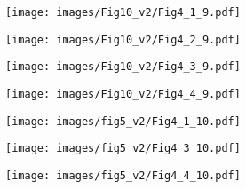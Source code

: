 \begin{figure*}
    \begin{subfigure}{0.24\textwidth}
        \centering
        \texttt{[image: images/Fig10\_v2/Fig4\_1\_9.pdf]}
\label{fig:qualisup:rgb}
        \end{subfigure}
    \hfill
        \begin{subfigure}{0.24\textwidth}
        \texttt{[image: images/Fig10\_v2/Fig4\_2\_9.pdf]}
\label{fig:qualisup:gt}
        \end{subfigure}
    \hfill
        \begin{subfigure}{0.24\textwidth}
        \texttt{[image: images/Fig10\_v2/Fig4\_3\_9.pdf]}
\label{fig:qualisup:pan}
        \end{subfigure}
    \hfill
        \begin{subfigure}{0.24\textwidth}
        \texttt{[image: images/Fig10\_v2/Fig4\_4\_9.pdf]}
\label{fig:qualisup:seg}
        \end{subfigure}
    \vfill
    \vspace{-.4cm}
        \begin{subfigure}{0.24\textwidth}
        \centering
        \texttt{[image: images/fig5\_v2/Fig4\_1\_10.pdf]}
\label{fig:qualisup2:rgb}
        \end{subfigure}
    \hfill
        \begin{subfigure}{0.24\textwidth}
        \centering
\label{fig:qualisup2:gt}
        \end{subfigure}
    \hfill
        \begin{subfigure}{0.24\textwidth}
        \texttt{[image: images/fig5\_v2/Fig4\_3\_10.pdf]}
        \label{fig:qualisup2:pan}
        \end{subfigure}
    \hfill
        \begin{subfigure}{0.24\textwidth}
        \texttt{[image: images/fig5\_v2/Fig4\_4\_10.pdf]}
        \label{fig:qualisup2:seg}
        \end{subfigure}
        

\end{figure*}
